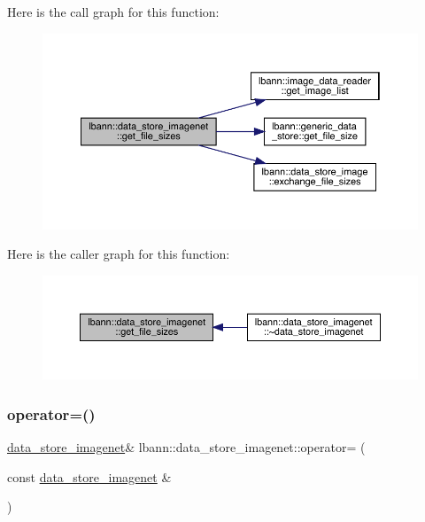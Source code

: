 Here is the call graph for this function\+:\nopagebreak
\begin{figure}[H]
\begin{center}
\leavevmode
\includegraphics[width=350pt]{classlbann_1_1data__store__imagenet_ae8f5d8741ddd762ffd3a477504bca619_cgraph}
\end{center}
\end{figure}
Here is the caller graph for this function\+:\nopagebreak
\begin{figure}[H]
\begin{center}
\leavevmode
\includegraphics[width=350pt]{classlbann_1_1data__store__imagenet_ae8f5d8741ddd762ffd3a477504bca619_icgraph}
\end{center}
\end{figure}
\mbox{\label{classlbann_1_1data__store__imagenet_a71b04726b0e651bc9b73cd6f5ca3c12b}} 
\subsubsection{\texorpdfstring{operator=()}{operator=()}}
{\footnotesize\ttfamily \hyperlink{classlbann_1_1data__store__imagenet}{data\+\_\+store\+\_\+imagenet}\& lbann\+::data\+\_\+store\+\_\+imagenet\+::operator= (\begin{DoxyParamCaption}\item[{const \hyperlink{classlbann_1_1data__store__imagenet}{data\+\_\+store\+\_\+imagenet} \&}]{ }\end{DoxyParamCaption})\hspace{0.3cm}{\ttfamily [default]}}



